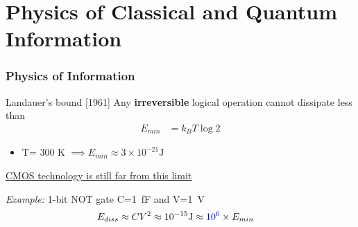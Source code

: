 \section[Physics of Information]{Physics of Classical and Quantum Information}

\begin{frame}
\frametitle{Physics of Information}
\begin{block}{Landauer's bound [1961]}
Any {\bf irreversible} logical operation cannot dissipate less than
\begin{align*}
E_{min} &=k_B T \log 2  
\end{align*}
\note{}
\end{block}

\begin{itemize}
\item  T= 300 K $\implies E_{min} \approx  3 \times 10^{-21} \si{\joule}$
\end{itemize}

\pause
\underline{\href{file:../../../courses/PCQI/presentation/main.pdf}{CMOS technology is still far from this limit} }
\pause

\vspace{1em}
\emph{Example:} 1-bit NOT gate C=\SI{1}{\femto\farad} and V=\SI{1}{\volt}
\begin{align*}
E_{diss} \approx CV^2 &\approx  10^{-15} \si{\joule} \approx {\color{blue} 10^6} \times E_{min}
\end{align*}
\end{frame}


